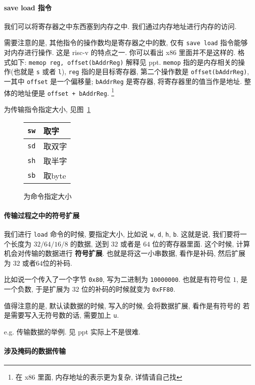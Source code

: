 \documentclass[12pt]{ctexart}
\theoremstyle{definition}
\theoremstyle{definition}
\theoremstyle{plain}
\begin{document}
\paragraph{save load 指令}
我们可以将寄存器之中东西塞到内存之中. 我们通过内存地址进行内存的访问. 

需要注意的是, 其他指令的操作数均是寄存器之中的数, 仅有 \texttt{save load} 指令能够对内存进行操作. 
这是 risc-v 的特点之一. 你可以看出 x86 里面并不是这样的. 格式如下: 
\texttt{memop reg, offset(bAddrReg)}
解释见 ppt. \texttt{memop} 指的是内存相关的操作(也就是 \texttt{s} 或者 \texttt{l}), \texttt{reg} 指的是目标寄存器, 第二个操作数是 
\texttt{offset(bAddrReg)}, 一其中 \texttt{offset} 是一个偏移量; \texttt{bAddrReg} 是寄存器, 将寄存器里的值当作是地址. 整体的地址便是 \texttt{offset + bAddrReg}. \footnote{在 x86 里面, 内存地址的表示更为复杂, 详情请自己找}

为传输指令指定大小, 见图~\ref{tab:daxiao}
\begin{figure}
		\centering
		\begin{tabular}{|c|l|}
		\hline 
		\texttt{sw} &  取字   \\ \hline 
		\texttt{sd} &  取双字 \\ \hline 
		\texttt{sh} &  取半字 \\ \hline 
		\texttt{sb} &  取byte \\ \hline 
		\end{tabular}
		\caption{为命令指定大小}\label{tab:daxiao}
\end{figure}

\paragraph{传输过程之中的符号扩展}
我们进行 \texttt{load} 命令的时候, 要指定大小, 比如说 \texttt{w}, \texttt{d}, \texttt{h}, \texttt{b}.
这就是说, 我们要将一个长度为 \(32/64/16/8\) 的数据, 送到 \(32\) 或者是 \(64\) 位的寄存器里面. 这个时候, 
计算机会对传输的数据进行 \textbf{符号扩展}. 也就是将这一小串数据, 看作是补码, 然后扩展为 \(32\) 或者\(64\)位的补码. 

比如说一个传入了一个字节 \texttt{0x80}, 写为二进制为 \texttt{10000000}. 也就是有符号位 \(1\), 是一个负数, 于是扩展为 \(32\) 位的补码的时候就变为 \texttt{0xFF80}.

值得注意的是, 默认读数据的时候, 写入的时候, 会将数据扩展, 看作是有符号的
若是需要写入无符号数的话, 需要加上 \texttt{u}. 

e.g. 传输数据的举例. 见 ppt 实际上不是很难. 

\paragraph{涉及掩码的数据传输}

\end{document}
